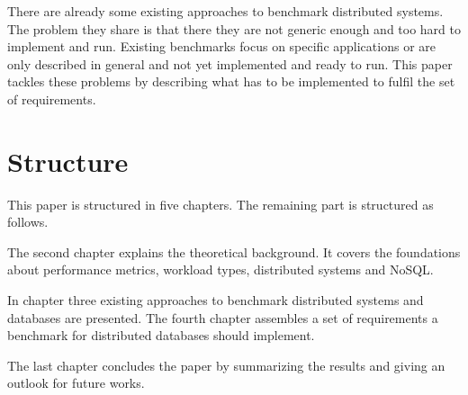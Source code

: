 There are already some existing approaches to benchmark distributed systems. The problem they share is that there they are not generic enough and too hard to implement and run. Existing benchmarks focus on specific applications or are only described in general and not yet implemented and ready to run. This paper tackles these problems by describing what has to be implemented to fulfil the set of requirements.


\section{Structure}
\label{sec:structure}
This paper is structured in five chapters. The remaining part is structured as follows.

The second chapter explains the theoretical background. It covers the foundations about performance metrics, workload types, distributed systems and NoSQL.

In chapter three existing approaches to benchmark distributed systems and databases are presented. The fourth chapter assembles a set of requirements a benchmark for distributed databases should implement.

The last chapter concludes the paper by summarizing the results and giving an outlook for future works.